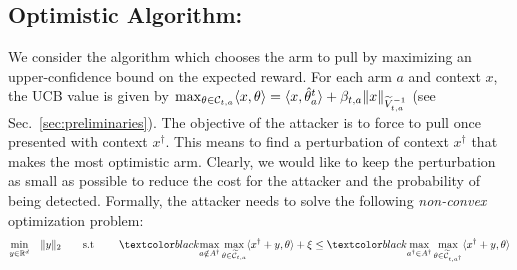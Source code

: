 \subsection{Optimistic Algorithm: \linucb}
\label{sec:optimistic_algorithms}
We consider the \linucb algorithm which chooses the arm to pull by maximizing an upper-confidence bound on the expected reward.
For each arm $a$ and context $x$, the UCB value is given by $\max_{\theta \in \mathcal{C}_{t,a}}  \langle x, \theta \rangle = \langle x, \hat{\theta}_{a}^t \rangle + \beta_{t,a} \|x \|_{\widetilde{V}_{t,a}^{-1}}$ (see Sec.~\ref{sec:preliminaries}).
%
The objective of the attacker is to force \linucb to pull  once presented with context $x^\dagger$.
This means to find a perturbation of context $x^\dagger$ that makes  the most optimistic arm.
Clearly, we would like to keep the perturbation as small as possible to reduce the cost for the attacker and the probability of being detected. Formally, the attacker needs to solve the following \emph{non-convex} optimization problem:
\begin{equation}\label{eq:attack_one_user}
\begin{aligned}
\min_{y\in \mathbb{R}^{d}} \quad & \|y\|_2 \quad \quad \text{s.t }\quad &  \changelm{\max_{a\notin A^\dagger}}\max_{\theta \in \wt{\mathcal{C}}_{t,a}}  \langle x^\dagger + y, \theta \rangle + \xi \leq \changebrtwo{\max_{a^\dagger \in A^\dagger}} \max_{\theta \in \widetilde{\mathcal{C}}_{t,a^\dagger}}  \langle x^\dagger + y, \theta \rangle \\
\end{aligned}
\end{equation}
